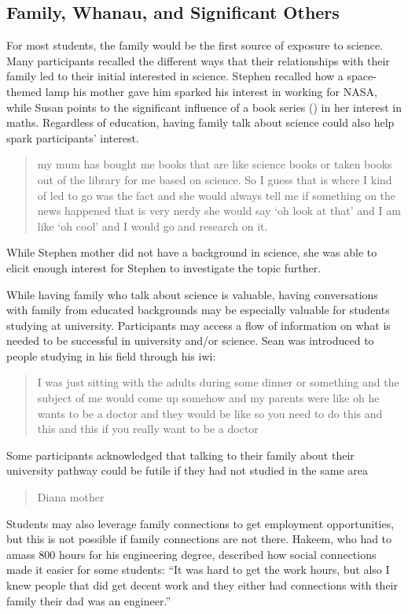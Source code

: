 \subsection{Family, Whanau, and Significant Others}
For most students, the family would be the first source of exposure to science. Many participants recalled the different ways that their relationships with their family led to their initial interested in science. Stephen recalled how a space-themed lamp his mother gave him sparked his interest in working for NASA, while Susan points to the significant influence of a book series () in her interest in maths. Regardless of education, having family talk about science could also help spark participants' interest. \blockquote{my mum has bought me books that are like science books or taken books out of the library for me based on science. So I guess that is where I kind of led to go was the fact and she would always tell me if something on the news happened that is very nerdy she would say `oh look at that' and I am like `oh cool' and I would go and research on it.} While Stephen mother did not have a background in science, she was able to elicit enough interest for Stephen to investigate the topic further.

While having family who talk about science is valuable, having conversations with family from educated backgrounds may be especially valuable for students studying at university. Participants may access a flow of information on what is needed to be successful in university and/or science. Sean was introduced to people studying in his field through his iwi: \blockquote{I was just sitting with the adults during some dinner or something and the subject of me would come up somehow and my parents were like oh he wants to be a doctor and they would be like so you need to do this and this and this if you really want to be a doctor}. Some participants acknowledged that talking to their family about their university pathway could be futile if they had not studied in the same area \blockquote{Diana mother}. Students may also leverage family connections to get employment opportunities, but this is not possible if family connections are not there. Hakeem, who had to amass 800 hours for his engineering degree, described how social connections made it easier for some students: ``It was hard to get the work hours, but also I knew people that did get decent work and they either had connections with their family their dad was an engineer.'' 


